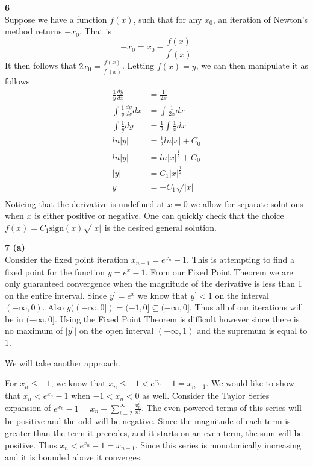 \documentclass[12pt]{article}
\newcommand{\problem}[1]{\hspace{-4 ex} \large \textbf{#1}\\}
\begin{document}
\problem{6} 
	Suppose we have a function $f(x)$, such that for any $x_0$, an iteration of Newton's method returns $-x_0$. That is 
	$$
	-x_0 = x_0 - \frac{f(x)}{f^\prime(x)}
	$$
	It then follows that $2x_0 = \frac{f(x)}{f^\prime(x)}$. Letting $f(x)=y$, we can then manipulate it as follows
	\begin{align*}
		\frac{1}{y}\frac{dy}{dx} & = \frac{1}{2x} \\
		\int \frac{1}{y}\frac{dy}{dx} dx & = \int \frac{1}{2x} dx \\
		\int \frac{1}{y}dy & = \frac{1}{2}\int \frac{1}{x} dx \\
		ln\vert y \vert & = \frac{1}{2} ln\vert x \vert + C_0 \\
		ln\vert y \vert & = ln\vert x \vert^\frac{1}{2} + C_0 \\
		\vert y \vert & = C_1 \vert x \vert^\frac{1}{2} \\
		y & = \pm C_1 \sqrt{\vert x \vert} \\
	\end{align*}
	Noticing that the derivative is undefined at $x=0$ we allow for separate solutions when $x$ is either positive or negative. One can quickly check that the choice $f(x)=C_1 \text{sign}(x)\sqrt{\vert x \vert}$ is the desired general solution.

\problem{7 (a)}
	Consider the fixed point iteration $x_{n+1}=e^{x_n}-1$. This is attempting to find a fixed point for the function $y=e^x-1$. From our Fixed Point Theorem we are only guaranteed convergence when the magnitude of the derivative is less than 1 on the entire interval. Since $y^\prime=e^x$ we know that $y^\prime<1$ on the interval $(-\infty,0)$. Also $y((-\infty,0]) = (-1,0] \subseteq (-\infty,0]$. Thus all of our iterations will be in $(-\infty,0]$. Using the Fixed Point Theorem is difficult however since there is no maximum of $\vert y^\prime \vert $ on the open interval $(-\infty,1)$ and the supremum is equal to 1. \bigbreak
	
	We will take another approach. \bigbreak
	
	For $x_n\leq-1$, we know that $x_n\leq-1< e^{x_n}-1 = x_{n+1}$. We would like to show that $x_n<e^{x_n}-1$ when $-1 < x_n < 0$ as well. Consider the Taylor Series expansion of $e^{x_n}-1 = x_n + \sum\limits_{i=2}^\infty \frac{x_n^i}{n!}$. The even powered terms of this series will be positive and the odd will be negative. Since the magnitude of each term is greater than the term it precedes, and it starts on an even term, the sum will be positive. Thus $x_n<e^{x_n}-1=x_{n+1}$. Since this series is monotonically increasing and it is bounded above it converges. \bigbreak
	
\end{document}
